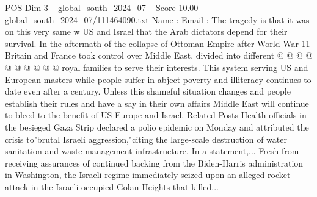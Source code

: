 \begin{textsample}{POS Dim 3 – global\_south\_2024\_07 – Score 10.00 – global\_south\_2024\_07/111464090.txt}
Name : Email : The tragedy is that it was on this very same w US and Israel that the Arab dictators depend for their survival.
In the aftermath of the collapse of Ottoman Empire after World War 11 Britain and France took control over Middle East, divided into different @ @ @ @ @ @ @ @ @ @ royal families to serve their interests.
This system serving US and European masters while people suffer in abject poverty and illiteracy continues to date even after a century.
Unless this shameful situation changes and people establish their rules and have a say in their own affairs Middle East will continue to bleed to the benefit of US-Europe and Israel.
Related Posts Health officials in the besieged Gaza Strip declared a polio epidemic on Monday and attributed the crisis to"brutal Israeli aggression,"citing the large-scale destruction of water sanitation and waste management infrastructure.
In a statement,...
Fresh from receiving assurances of continued backing from the Biden-Harris administration in Washington, the Israeli regime immediately seized upon an alleged rocket attack in the Israeli-occupied Golan Heights that killed...

\end{textsample}
